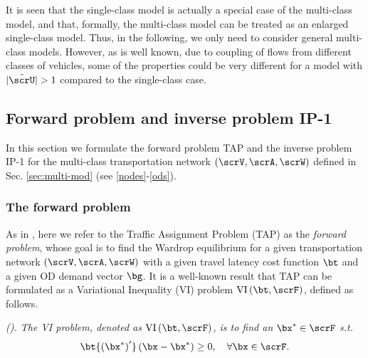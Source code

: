 \documentclass[3p]{elsarticle}
\begin{document}
	
It is seen that the single-class model is actually a special case of the
multi-class model, and that, formally, the multi-class model can be
treated as an enlarged single-class model. Thus, in the following, we
only need to consider general multi-class models. However, as is well
known, due to coupling of flows from different classes of vehicles, some
of the properties could be very different for a model with $|\tilde
\scrU| > 1$ compared to the single-class case.
	
	
\subsection{Forward problem and inverse problem IP-1}
	
In this section we formulate the forward problem TAP and the inverse
problem IP-1 for the multi-class transportation network $\left( \scrV,
  \scrA,\scrW \right)$ defined in Sec. \ref{sec:multi-mod} (see
\eqref{nodes}-\eqref{ods}).
	
\subsubsection{The forward problem}  \label{sec:forward}
	
As in \cite{CDC16}, here we refer to the Traffic Assignment Problem
(TAP) as the \textit{forward problem}, whose goal is to find the Wardrop
equilibrium for a given transportation network $\left( \scrV,
  \scrA,\scrW \right)$ with a given travel latency cost function $\bt$
and a given OD demand vector $\bg$.  It is a well-known result that TAP
can be formulated as a Variational Inequality (VI) problem
$\text{VI}\left( {\bt,\scrF} \right)$, defined as follows.
	
\begin{defi}
  \label{cdc16-def2} \em{(\cite{bertsimas2014data})}. The VI problem,
  denoted as $\text{VI}\left( {\bt,\scrF} \right)$, is to find an ${\bx^
    * } \in \scrF$ s.t.
\begin{align}
		\bt{\left( {{\bx^ * }} \right)'}\left( {\bx - {\bx^ * }} \right) \geq 0, \quad \forall \bx \in \scrF. \label{cdc16-VI}
\end{align}
\end{defi}
	
\end{document}
